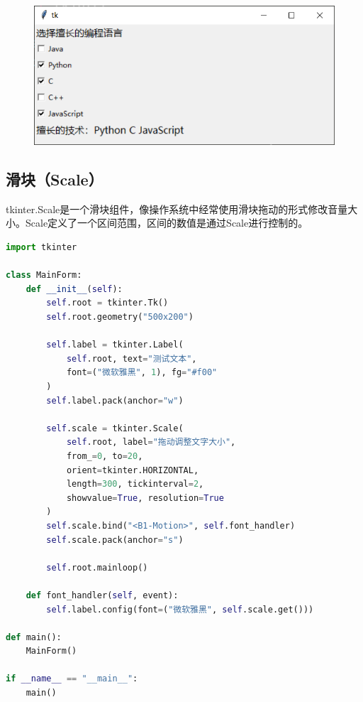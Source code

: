\begin{tcolorbox}
	\begin{figure}[H]
		\centering
		\includegraphics[]{img/C13/13-4/3.png}
	\end{figure}
\end{tcolorbox}

\vspace{0.5cm}

\subsection{滑块（Scale）}

tkinter.Scale是一个滑块组件，像操作系统中经常使用滑块拖动的形式修改音量大小。Scale定义了一个区间范围，区间的数值是通过Scale进行控制的。\\


\begin{lstlisting}[language=Python]
import tkinter

class MainForm:
    def __init__(self):
        self.root = tkinter.Tk()
        self.root.geometry("500x200")

        self.label = tkinter.Label(
            self.root, text="测试文本", 
            font=("微软雅黑", 1), fg="#f00"
        )
        self.label.pack(anchor="w")

        self.scale = tkinter.Scale(
            self.root, label="拖动调整文字大小",
            from_=0, to=20,
            orient=tkinter.HORIZONTAL,
            length=300, tickinterval=2,
            showvalue=True, resolution=True
        )
        self.scale.bind("<B1-Motion>", self.font_handler)
        self.scale.pack(anchor="s")

        self.root.mainloop()
    
    def font_handler(self, event):
        self.label.config(font=("微软雅黑", self.scale.get()))

def main():
    MainForm()

if __name__ == "__main__":
    main()
\end{lstlisting}


